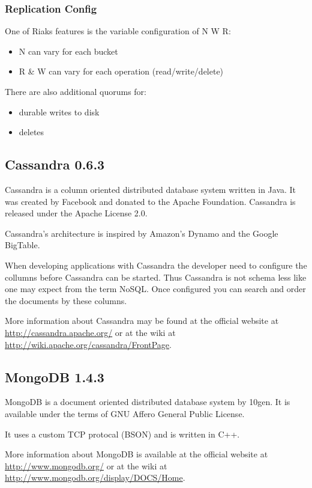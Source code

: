 \documentclass{llncs}
\begin{document}
\subsubsection{Replication Config}

One of Riaks features is the variable configuration of N W R:

\begin{itemize}
\item
  N can vary for each bucket
\item
  R \& W can vary for each operation (read/write/delete)
\end{itemize}
There are also additional quorums for:

\begin{itemize}
\item
  durable writes to disk
\item
  deletes
\end{itemize}
\subsection{Cassandra 0.6.3}

Cassandra is a column oriented distributed database system written
in Java. It was created by Facebook and donated to the Apache
Foundation. Cassandra is released under the Apache License 2.0.

Cassandra's architecture is inspired by Amazon's Dynamo and the
Google BigTable.

When developing applications with Cassandra the developer need to
configure the collumns before Cassandra can be started. Thus
Cassandra is not schema less like one may expect from the term
NoSQL. Once configured you can search and order the documents by
these columns.

More information about Cassandra may be found at the official
website at \url{http://cassandra.apache.org/} or at the wiki at
\url{http://wiki.apache.org/cassandra/FrontPage}.

\subsection{MongoDB 1.4.3}

MongoDB is a document oriented distributed database system by
10gen. It is available under the terms of GNU Affero General Public
License.

It uses a custom TCP protocal (BSON) and is written in C++.

More information about MongoDB is available at the official website
at \url{http://www.mongodb.org/} or at the wiki at
\url{http://www.mongodb.org/display/DOCS/Home}.
\end{document}
